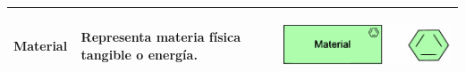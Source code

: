 \begin{longtable}{|p{0.15\linewidth}|p{0.45\linewidth}|p{0.4\linewidth} |}
    Material
    &
    Representa materia física tangible o energía.
    &
\begin{center}
    \includegraphics[width=0.8\linewidth]{imgs/capa_fisica/Material.pdf}
\end{center} 
    \\ \hline


\end{longtable}